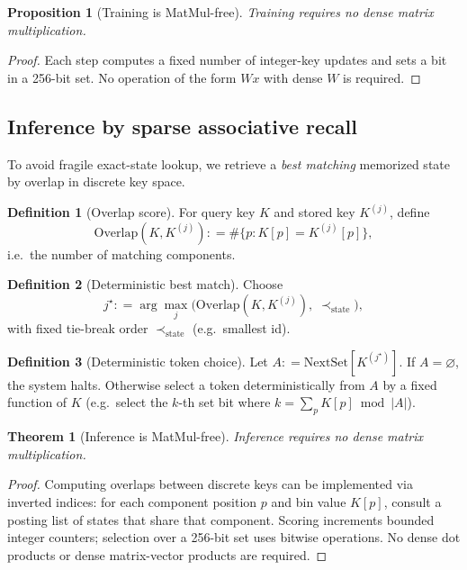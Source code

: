 \documentclass[11pt,a4paper]{article}
\theoremstyle{definition}
\newtheorem{definition}{Definition}[section]
\theoremstyle{plain}
\newtheorem{theorem}{Theorem}[section]
\newtheorem{proposition}{Proposition}[section]
\theoremstyle{remark}
\newcommand{\abs}[1]{\left\lvert #1 \right\rvert}
\newcommand{\defeq}{\mathrel{\mathop:}=}
\begin{document}
\begin{proposition}[Training is MatMul-free]\label{prop:train_nomul}
Training requires no dense matrix multiplication.
\end{proposition}
\begin{proof}
Each step computes a fixed number of integer-key updates and sets a bit in a 256-bit set.
No operation of the form $W x$ with dense $W$ is required.
\end{proof}

\subsection{Inference by sparse associative recall}
To avoid fragile exact-state lookup, we retrieve a \emph{best matching} memorized state by overlap in discrete key space.

\begin{definition}[Overlap score]
For query key $K$ and stored key $K^{(j)}$, define
\[
\mathrm{Overlap}(K,K^{(j)}) \defeq \#\{p : K[p] = K^{(j)}[p]\},
\]
i.e.\ the number of matching components.
\end{definition}

\begin{definition}[Deterministic best match]
Choose
\[
j^\star \defeq \arg\max_j \bigl(\mathrm{Overlap}(K,K^{(j)}),\; \prec_{\mathrm{state}}\bigr),
\]
with fixed tie-break order $\prec_{\mathrm{state}}$ (e.g.\ smallest id).
\end{definition}

\begin{definition}[Deterministic token choice]
Let $A \defeq \mathrm{NextSet}[K^{(j^\star)}]$.
If $A=\varnothing$, the system halts. Otherwise select a token deterministically from $A$
by a fixed function of $K$ (e.g.\ select the $k$-th set bit where $k = \sum_p K[p] \bmod \abs{A}$).
\end{definition}

\begin{theorem}[Inference is MatMul-free]\label{thm:infer_nomul}
Inference requires no dense matrix multiplication.
\end{theorem}
\begin{proof}
Computing overlaps between discrete keys can be implemented via inverted indices:
for each component position $p$ and bin value $K[p]$, consult a posting list of states that share that component.
Scoring increments bounded integer counters; selection over a 256-bit set uses bitwise operations.
No dense dot products or dense matrix-vector products are required.
\end{proof}
\end{document}
